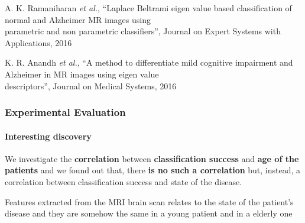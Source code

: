 \begin{frame}
	\cite{Ramaniharan16} A. K. Ramaniharan \emph{et al.}, ``Laplace Beltrami eigen value based
	classification of normal and Alzheimer MR images using\\ \hspace{0.25cm} parametric and non
	parametric classifiers'', Journal on Expert Systems with Applications, 2016
	
	\cite{Anandh16} K. R. Anandh \emph{et al.}, ``A method to differentiate mild cognitive impairment
	and Alzheimer in MR images using eigen value\\ \hspace{0.25cm} descriptors'', Journal on Medical
	Systems, 2016
\end{frame}

\begin{frame}
	\frametitle{Experimental Evaluation}
	\framesubtitle{Interesting discovery}
	
	\Large
	
	\vspace{0.4cm}
	
	We investigate the \textbf{correlation} between \textbf{classification success} and \textbf{age of
	the patients} and we found out that, there \textbf{is no such a correlation} but, instead, a
	correlation between classification success and state of the disease.
	
	\vspace{0.3cm}
	
	Features extracted from the MRI brain scan relates to the state of the patient's disease and they
	are somehow the same in a young patient and in a elderly one
\end{frame}
